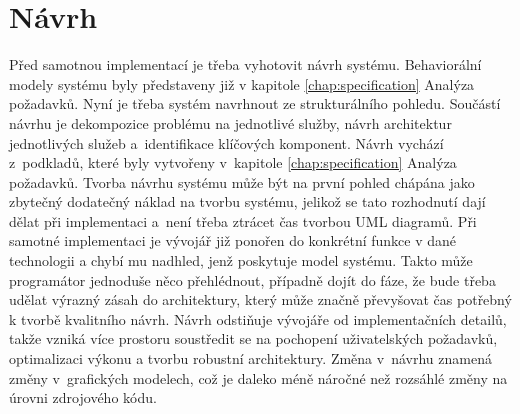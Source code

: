 \chapter{Návrh}
Před samotnou implementací je třeba vyhotovit návrh systému. Behaviorální modely systému byly představeny již v kapitole \ref{chap:specification} Analýza požadavků. Nyní je třeba systém navrhnout ze strukturálního pohledu. Součástí návrhu je dekompozice problému na jednotlivé služby, návrh architektur jednotlivých služeb a~identifikace klíčových komponent. Návrh vychází z~podkladů, které byly vytvořeny v~kapitole \ref{chap:specification} Analýza požadavků. Tvorba návrhu systému může být na první pohled chápána jako zbytečný dodatečný náklad na tvorbu systému, jelikož se tato rozhodnutí dají dělat při implementaci a~není třeba ztrácet čas tvorbou UML diagramů. Při samotné implementaci je vývojář již ponořen do konkrétní funkce v dané technologii a chybí mu nadhled, jenž poskytuje model systému. Takto může programátor jednoduše něco přehlédnout, případně dojít do fáze, že bude třeba udělat výrazný zásah do architektury, který může značně převyšovat čas potřebný k tvorbě kvalitního návrh. Návrh odstiňuje vývojáře od implementačních detailů, takže vzniká více prostoru soustředit se na pochopení uživatelských požadavků, optimalizaci výkonu a tvorbu robustní architektury. Změna v~návrhu znamená změny v~grafických modelech, což je daleko méně náročné než rozsáhlé změny na úrovni zdrojového kódu.

